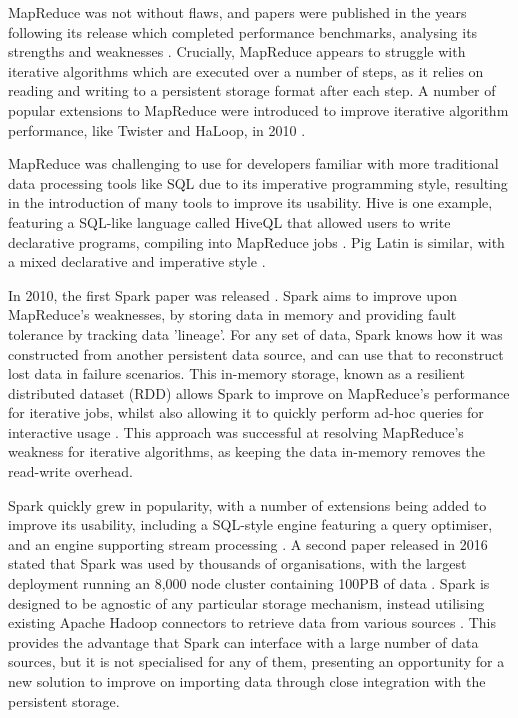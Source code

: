 MapReduce was not without flaws, and papers were published in the years following its release which completed performance benchmarks, analysing its strengths and weaknesses \cite{lee2012parallel}. Crucially, MapReduce appears to struggle with iterative algorithms which are executed over a number of steps, as it relies on reading and writing to a persistent storage format after each step. A number of popular extensions to MapReduce were introduced to improve iterative algorithm performance, like Twister and HaLoop, in 2010 \cite{ekanayake2010twister, bu2010haloop}.

MapReduce was challenging to use for developers familiar with more traditional data processing tools like SQL due to its imperative programming style, resulting in the introduction of many tools to improve its usability. Hive is one example, featuring a SQL-like language called HiveQL that allowed users to write declarative programs, compiling into MapReduce jobs \cite{thusoo2010hive}. Pig Latin is similar, with a mixed declarative and imperative  style \cite{olston2008pig}. 

In 2010, the first Spark paper was released \cite{zaharia2010spark}. Spark aims to improve upon MapReduce's weaknesses, by storing data in memory and providing fault tolerance by tracking data 'lineage'. For any set of data, Spark knows how it was constructed from another persistent data source, and can use that to reconstruct lost data in failure scenarios. This in-memory storage, known as a resilient distributed dataset (RDD) allows Spark to improve on MapReduce's performance for iterative jobs, whilst also allowing it to quickly perform ad-hoc queries for interactive usage \cite{zaharia2012rdd}. This approach was successful at resolving MapReduce's weakness for iterative algorithms, as keeping the data in-memory removes the read-write overhead. 

Spark quickly grew in popularity, with a number of extensions being added to improve its usability, including a SQL-style engine featuring a query optimiser, and an engine supporting stream processing \cite{armbrust2015sparksql, armbrust2018sparkstreaming}. A second paper released in 2016 stated that Spark was used by thousands of organisations, with the largest deployment running an 8,000 node cluster containing 100PB of data \cite{zaharia2016spark}. Spark is designed to be agnostic of any particular storage mechanism, instead utilising existing Apache Hadoop connectors to retrieve data from various sources \cite{rddprogrammingguide}. This provides the advantage that Spark can interface with a large number of data sources, but it is not specialised for any of them, presenting an opportunity for a new solution to improve on importing data through close integration with the persistent storage.

